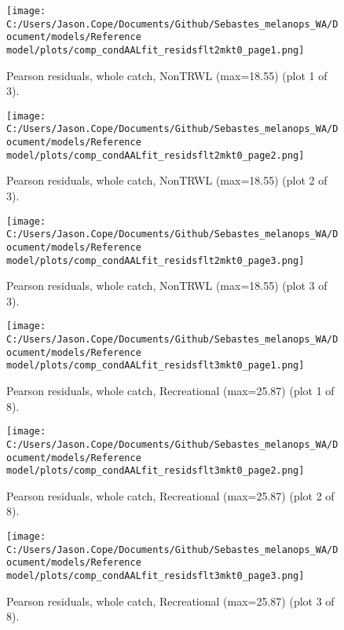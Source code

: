 \documentclass[11pt,
  english,
  letterpaper,
]{article}
\begin{document}
\begin{figure}
\centering
\texttt{[image: C:/Users/Jason.Cope/Documents/Github/Sebastes\_melanops\_WA/Document/models/Reference model/plots/comp\_condAALfit\_residsflt2mkt0\_page1.png]}
\caption{Pearson residuals, whole catch, NonTRWL (max=18.55) (plot 1 of 3).\label{fig:comp_condAALfit_residsflt2mkt0_page1}}
\end{figure}

\begin{figure}
\centering
\texttt{[image: C:/Users/Jason.Cope/Documents/Github/Sebastes\_melanops\_WA/Document/models/Reference model/plots/comp\_condAALfit\_residsflt2mkt0\_page2.png]}
\caption{Pearson residuals, whole catch, NonTRWL (max=18.55) (plot 2 of 3).\label{fig:comp_condAALfit_residsflt2mkt0_page2}}
\end{figure}

\begin{figure}
\centering
\texttt{[image: C:/Users/Jason.Cope/Documents/Github/Sebastes\_melanops\_WA/Document/models/Reference model/plots/comp\_condAALfit\_residsflt2mkt0\_page3.png]}
\caption{Pearson residuals, whole catch, NonTRWL (max=18.55) (plot 3 of 3).\label{fig:comp_condAALfit_residsflt2mkt0_page3}}
\end{figure}

\begin{figure}
\centering
\texttt{[image: C:/Users/Jason.Cope/Documents/Github/Sebastes\_melanops\_WA/Document/models/Reference model/plots/comp\_condAALfit\_residsflt3mkt0\_page1.png]}
\caption{Pearson residuals, whole catch, Recreational (max=25.87) (plot 1 of 8).\label{fig:comp_condAALfit_residsflt3mkt0_page1}}
\end{figure}

\begin{figure}
\centering
\texttt{[image: C:/Users/Jason.Cope/Documents/Github/Sebastes\_melanops\_WA/Document/models/Reference model/plots/comp\_condAALfit\_residsflt3mkt0\_page2.png]}
\caption{Pearson residuals, whole catch, Recreational (max=25.87) (plot 2 of 8).\label{fig:comp_condAALfit_residsflt3mkt0_page2}}
\end{figure}

\begin{figure}
\centering
\texttt{[image: C:/Users/Jason.Cope/Documents/Github/Sebastes\_melanops\_WA/Document/models/Reference model/plots/comp\_condAALfit\_residsflt3mkt0\_page3.png]}
\caption{Pearson residuals, whole catch, Recreational (max=25.87) (plot 3 of 8).\label{fig:comp_condAALfit_residsflt3mkt0_page3}}
\end{figure}
\end{document}
